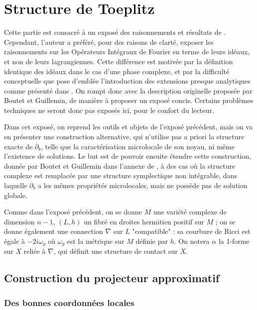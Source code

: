 \chapter{Structure de Toeplitz}

Cette partie est consacré à un exposé des raisonnements et résultats de \cite{Shiffman2002}. Cependant, l'auteur a préféré, pour des raisons de clarté, exposer les raisonnements sur les Opérateurs Intégraux de Fourier en terme de leurs idéaux, et non de leurs lagrangiennes. Cette différence est motivée par la définition identique des idéaux dans le cas d'une phase complexe, et par la difficulté conceptuelle que pose d'emblée l'introduction des extensions presque analytiques comme présenté dans \cite{melin1975fourier}. On rompt donc avec la description originelle proposée par Boutet et Guillemin, de manière à proposer un exposé concis. Certains problèmes techniques ne seront donc pas exposés ici, pour le confort du lecteur.

Dans cet exposé, on reprend les outils et objets de l'exposé précédent, mais on va en présenter une construction alternative, qui n'utilise pas a priori la structure exacte de $\overline{\partial}_b$, telle que la caractérisation microlocale de son noyau, ni même l'existence de solutions. Le but est de pouvoir ensuite étendre cette construction, donnée par Boutet et Guillemin dans l'annexe de \cite{BoutetdeMonvel1981}, à des cas où la structure complexe est remplacée par une structure symplectique non intégrable, dans laquelle $\overline{\partial}_b$ a les mêmes propriétés microlocales, mais ne possède pas de solution globale.

Comme dans l'exposé précédent, on se donne $M$ une variété complexe de dimension $n-1$, $(L,h)$ un fibré en droites hermitien positif sur $M$ ; on se donne également une connection $\nabla$ sur $L$ "compatible" : sa courbure de Ricci est égale à $-2i\omega_g$ où $\omega_g$ est la métrique sur $M$ définie par $h$. On notera $\alpha$ la 1-forme sur $X$ reliée à $\nabla$, qui définit une structure de contact sur $X$.

\section{Construction du projecteur approximatif}

\subsection{Des bonnes coordonnées locales}

